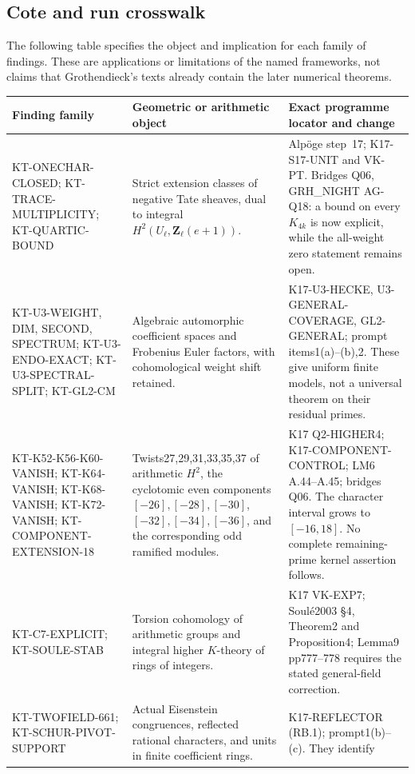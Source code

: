 \documentclass[11pt,a4paper]{article}
\theoremstyle{definition}
\begin{document}
\subsection{Cote and run crosswalk}

The following table specifies the object and implication for
each family of findings. These are applications or limitations
of the named frameworks, not claims that Grothendieck's texts
already contain the later numerical theorems.

\small
\begin{longtable}{>{\raggedright\arraybackslash}p{}
>{\raggedright\arraybackslash}p{}
>{\raggedright\arraybackslash}p{}}
\toprule
Finding family & Geometric or arithmetic object & Exact programme locator and change\\
\midrule\endhead
KT-ONECHAR-CLOSED; KT-TRACE-MULTIPLICITY; KT-QUARTIC-BOUND &
Strict extension classes of negative Tate sheaves, dual to
integral $H^2(U_\ell,\mathbf Z_\ell(e+1))$. &
Alp\"oge step~17; K17-S17-UNIT and VK-PT. Bridges Q06,
GRH\_NIGHT AG-Q18: a bound on every $K_{4k}$ is now explicit,
while the all-weight zero statement remains open.\\
KT-U3-WEIGHT, DIM, SECOND, SPECTRUM; KT-U3-ENDO-EXACT; KT-U3-SPECTRAL-SPLIT; KT-GL2-CM &
Algebraic automorphic coefficient spaces and Frobenius Euler
factors, with cohomological weight shift retained. &
K17-U3-HECKE, U3-GENERAL-COVERAGE, GL2-GENERAL; prompt
items1(a)--(b),2. These give uniform finite models, not a
universal theorem on their residual primes.\\
KT-K52-K56-K60-VANISH; KT-K64-VANISH; KT-K68-VANISH; KT-K72-VANISH;
KT-COMPONENT-EXTENSION-18 &
Twists27,29,31,33,35,37 of arithmetic $H^2$, the cyclotomic even components
$[-26],[-28],[-30]$, $[-32],[-34],[-36]$, and the corresponding odd ramified modules. &
K17 Q2-HIGHER4; K17-COMPONENT-CONTROL; LM6 A.44--A.45;
bridges Q06. The character interval grows to $[-16,18]$.
No complete remaining-prime kernel assertion follows.\\
KT-C7-EXPLICIT; KT-SOULE-STAB &
Torsion cohomology of arithmetic groups and integral higher
$K$-theory of rings of integers. &
K17 VK-EXP7; Soul\'e2003 \S4, Theorem2 and Proposition4;
Lemma9 pp777--778 requires the stated general-field correction.\\
KT-TWOFIELD-661; KT-SCHUR-PIVOT-SUPPORT &
Actual Eisenstein congruences, reflected rational characters,
and units in finite coefficient rings. &
K17-REFLECTOR (RB.1); prompt1(b)--(c). They identify

\end{longtable}
\end{document}
